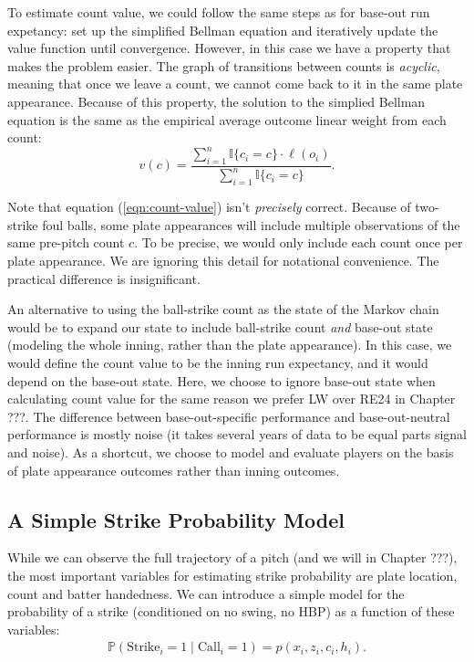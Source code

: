 \documentclass{article}
\begin{document}
    To estimate count value, we could follow the same steps as for base-out run expetancy: set up the simplified Bellman equation and iteratively update the value function until convergence. However, in this case we have a property that makes the problem easier. The graph of transitions between counts is {\it acyclic}, meaning that once we leave a count, we cannot come back to it in the same plate appearance. Because of this property, the solution to the simplied Bellman equation is the same as the empirical average outcome linear weight from each count:
    \begin{equation}
      \label{eqn:count-value}
      v(c) = \frac
        {\sum_{i = 1}^n \mathbb{I}\{c_i = c\} \cdot \ell(o_i)}
        {\sum_{i = 1}^n \mathbb{I}\{c_i = c\}}.
    \end{equation}

    Note that equation (\ref{eqn:count-value}) isn't {\it precisely} correct. Because of two-strike foul balls, some plate appearances will include multiple observations of the same pre-pitch count $c$. To be precise, we would only include each count once per plate appearance. We are ignoring this detail for notational convenience. The practical difference is insignificant.

    An alternative to using the ball-strike count as the state of the Markov chain would be to expand our state to include ball-strike count {\it and} base-out state (modeling the whole inning, rather than the plate appearance). In this case, we would define the count value to be the inning run expectancy, and it would depend on the base-out state. Here, we choose to ignore base-out state when calculating count value for the same reason we prefer LW over RE24 in Chapter ???. The difference between base-out-specific performance and base-out-neutral performance is mostly noise (it takes several years of data to be equal parts signal and noise). As a shortcut, we choose to model and evaluate players on the basis of plate appearance outcomes rather than inning outcomes.

  \subsection{\sc A Simple Strike Probability Model}

    While we can observe the full trajectory of a pitch (and we will in Chapter ???), the most important variables for estimating strike probability are plate location, count and batter handedness. We can introduce a simple model for the probability of a strike (conditioned on no swing, no HBP) as a function of these variables:
    \begin{align*}
      \mathbb{P}(\mbox{Strike}_i = 1 \mid \mbox{Call}_i = 1) = p(x_i, z_i, c_i, h_i).
    \end{align*}
\end{document}

